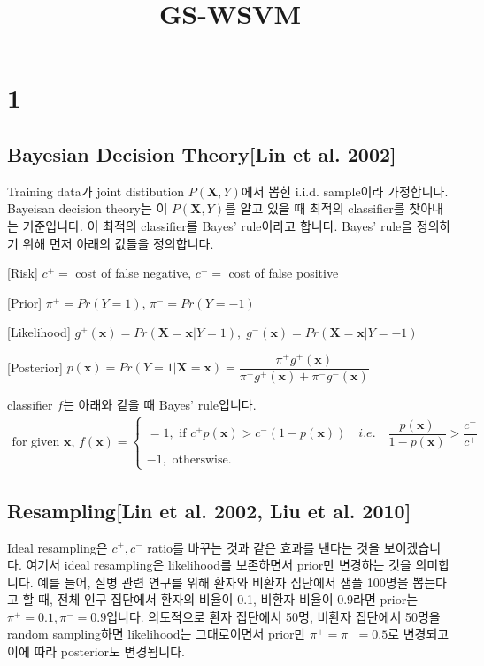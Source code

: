 \documentclass[11pt]{article}
\begin{document}
\title{GS-WSVM}
\section{1}
\subsection{Bayesian Decision Theory[Lin et al. 2002]}
Training data가 joint distibution $P(\mathbf{X},Y)$에서 뽑힌 i.i.d. sample이라 가정합니다. Bayeisan decision theory는 이 $P(\mathbf{X},Y)$를 알고 있을 때 최적의 classifier를 찾아내는 기준입니다. 이 최적의 classifier를 Bayes' rule이라고 합니다. Bayes' rule을 정의하기 위해 먼저 아래의 값들을 정의합니다.

[Risk] $c^+ =$ cost of false negative, $c^- = $ cost of false positive

[Prior] $\pi^+ = Pr(Y = 1)$, $\pi^- = Pr(Y = -1)$

[Likelihood] $
g^+(\mathbf{x}) = Pr(\mathbf{X}= \mathbf{x} | Y = 1),
\;
g^-(\mathbf{x}) = Pr(\mathbf{X}= \mathbf{x} | Y = -1)
$

[Posterior] $
p(\mathbf{x}) = Pr(Y = 1 | \mathbf{X} = \mathbf{x})
= \dfrac{\pi^+ g^+(\mathbf{x})}{\pi^+ g^+(\mathbf{x}) + \pi^- g^-(\mathbf{x})}
$

classifier $f$는 아래와 같을 때 Bayes' rule입니다.
\begin{align*}
	\text{for given $\mathbf{x}$, } f(\mathbf{x})=
	\begin{cases}
		= 1, \text{ if }
		c^+ p(\mathbf{x}) > c^- (1 - p(\mathbf{x}))
		\quad i.e.\quad
		\dfrac{p(\mathbf{x}) }{1 - p(\mathbf{x}) } > \dfrac{c^-}{c^+}
		\\
		-1, \text{ otherswise}.
	\end{cases}
\end{align*}

\subsection{Resampling[Lin et al. 2002, Liu et al. 2010]}
Ideal resampling은 $c^+, c^-$ ratio를 바꾸는 것과 같은 효과를 낸다는 것을 보이겠습니다. 여기서 ideal resampling은 likelihood를 보존하면서 prior만 변경하는 것을 의미합니다. 예를 들어, 질병 관련 연구를 위해 환자와 비환자 집단에서 샘플 100명을 뽑는다고 할 때, 전체 인구 집단에서 환자의 비율이 0.1, 비환자 비율이 0.9라면 prior는 $\pi^+ = 0.1, \pi^- = 0.9$입니다. 의도적으로 환자 집단에서 50명, 비환자 집단에서 50명을 random sampling하면 likelihood는 그대로이면서 prior만 $\pi^+ = \pi^- = 0.5$로 변경되고 이에 따라 posterior도 변경됩니다.
\end{document}
